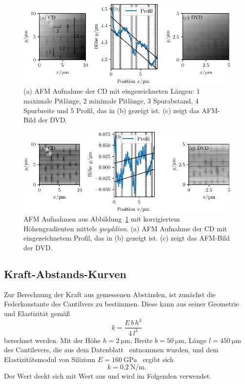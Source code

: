 \begin{figure}
  \centering
  \includegraphics[scale = 1]{../analysis/data/cd/cd_profil.pdf}
  \caption{(a) AFM Aufnahme der CD mit eingezeichneten Längen: 1 maximale Pitlänge, 2 minimale Pitlänge,
  3 Spurabstand, 4 Spurbreite und 5 Profil, das in (b) gezeigt ist. (c) zeigt das AFM-Bild der DVD.}
  \label{fig: cd}
\end{figure}

\begin{figure}
  \centering
  \includegraphics[scale = 1]{../analysis/data/cd/cd_profil_korrektur.pdf}
  \caption{AFM Aufnahmen aus Abbildung~\ref{fig: cd} mit korrigiertem Höhengradienten
  mittels \emph{gwyddion}. (a) AFM Aufnahme der CD mit eingezeichnetem Profil, das in
  (b) gezeigt ist. (c) zeigt das AFM-Bild der DVD.}
  \label{fig: cd_korrektur}
\end{figure}

\FloatBarrier
\subsection{Kraft-Abstands-Kurven}
Zur Berechnung der Kraft aus gemessenen Abständen, ist zunächst die Federkonstante des Cantilvers zu bestimmen. Diese kann
aus seiner Geometrie und Elastizität gemäß
\begin{equation}
  k = \frac{E \, b \, h^3}{4 \, l^3}
\end{equation}
berechnet werden. Mit der Höhe $h = \SI{2}{\micro\meter}$, Breite $b = \SI{50}{\micro\meter}$, Länge $l = \SI{450}{\micro\meter}$
des Cantilevers, die aus dem Datenblatt~\cite{cantilever} entnommen wurden, und dem Elastizitätsmodul von Silizium
$E = \SI{160}{\giga\pascal}$~\cite{emodulsi}
ergibt sich
\begin{equation}
  k = \SI{0.2}{\newton \per \meter}.
\end{equation}
Der Wert deckt sich mit Wert aus \cite{cantilever} und wird im Folgenden verwendet.

